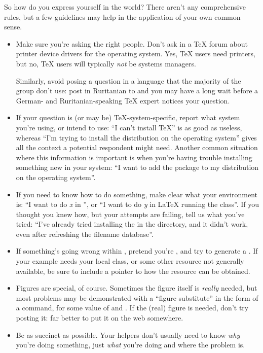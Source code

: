 So how do you express yourself in the \AllTeX{} world?  There aren't
any comprehensive rules, but a few guidelines may help in the
application of your own common sense.
\begin{itemize}
\item Make sure you're asking the right people.  Don't ask in a \TeX{}
  forum about printer device drivers for the 
  operating system.  Yes, \TeX{} users need printers, but no, \TeX{}
  users will typically \emph{not} be  systems
  managers.

  Similarly, avoid posing a question in a language that the majority
  of the group don't use: post in Ruritanian to
   and you may have a long wait before a
  German- and Ruritanian-speaking \TeX{} expert notices your
  question.
\item If your question is (or may be) \TeX{}-system-specific, report
  what system you're using, or intend to use: ``I can't install
  \TeX{}'' is as good as useless, whereas ``I'm trying to install the
   distribution on the 
  operating system'' gives all the context a potential respondent
  might need.  Another common situation where this information is
  important is when you're having trouble installing something new in
  your system: ``I want to add the  package to my
   distribution on the 
  operating system''.
\item If you need to know how to do something, make clear what your
  environment is: ``I want to do \emph{x} in \plaintex{}'', or ``I
  want to do \emph{y} in \LaTeX{} running the 
  class''.  If you thought you knew how, but your attempts are
  failing, tell us what you've tried: ``I've already tried installing
  the  in the  directory, and it
  didn't work, even after refreshing the filename database''.
\item If something's going wrong within \AllTeX{}, pretend you're
  ,
  and try to generate a .
  If your example 
  needs your local  class, or some other resource
  not generally available, be sure to include a pointer to how the
  resource can be obtained.
\item Figures are special, of course.  Sometimes the figure itself is
  \emph{really} needed, but most problems may be demonstrated with a
  ``figure substitute'' in the form of a
   command, for some value of
   and .  If the (real) figure is needed,
  don't try posting it: far better to put it on the web somewhere.
\item Be as succinct as possible.  Your helpers don't usually need to
  know \emph{why} you're doing something, just \emph{what} you're
  doing and where the problem is.
\end{itemize}

